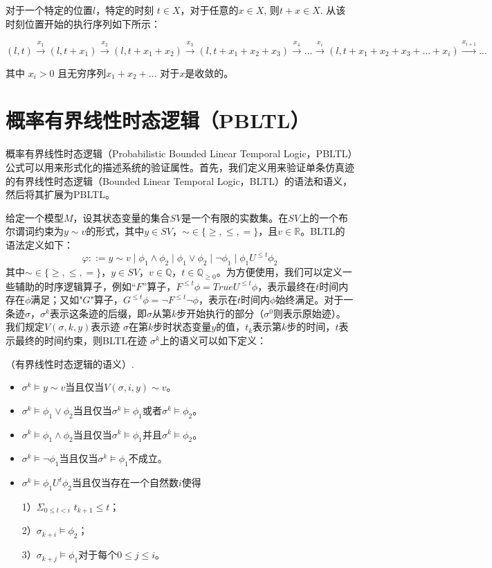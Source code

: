 对于一个特定的位置$l$，特定的时刻 $t \in X$，对于任意的$x \in X$, 则$t + x \in X$. 从该时刻位置开始的执行序列如下所示：

$(l,t) \xrightarrow{x_{1}} (l,t+x_{1}) \xrightarrow{x_{2}} (l,t+x_{1}+x_{2}) \xrightarrow{x_{3}} (l,t+x_{1}+x_{2}+x_{3}) \xrightarrow{x_{4}}...\xrightarrow{x_{i}}(l,t+x_{1}+x_{2}+x_{3}+...+x_{i}) \xrightarrow{x_{i+1}}...$

其中 $x_{i} > 0$ 且无穷序列$x_{1} + x_{2} + . . .$ 对于$x$是收敛的。 

\section{概率有界线性时态逻辑（PBLTL）}
概率有界线性时态逻辑（Probabilistic Bounded Linear Temporal Logic，PBLTL）公式可以用来形式化的描述系统的验证属性。首先，我们定义用来验证单条仿真迹的有界线性时态逻辑（Bounded Linear Temporal Logic，BLTL）的语法和语义，然后将其扩展为PBLTL。

给定一个模型$M$，设其状态变量的集合$SV$是一个有限的实数集。在$SV$上的一个布尔谓词约束为$y \sim v$的形式，其中$y\in SV$，$\sim \in \lbrace \geq,\leq,=\rbrace$，且$v\in \mathbb{R}$。BLTL的语法定义如下：
$$\varphi ::= y \sim v\mid\phi_{1}\wedge\phi_{2}\mid\phi_{1}\vee\phi_{2}\mid \neg \phi_{1}\mid\phi_{1}U^{\leq t}\phi_{2}
$$
其中$\sim \in \lbrace \geq,\leq,=\rbrace$，$y\in SV$，$v\in \mathbb{Q}$，$t\in \mathbb{Q}_{\geq 0}$。为方便使用，我们可以定义一些辅助的时序逻辑算子，例如“$F$”算子，$F^{\leq t}\phi = True U^{\leq t}\phi$，表示最终在$t$时间内存在$\phi$满足；又如"$G$"算子，$G^{\leq t}\phi = \neg F^{\leq t}\neg \phi$，表示在$t$时间内$\phi$始终满足。对于一条迹$\sigma$，$\sigma^k$表示这条迹的后缀，即$\sigma$从第$k$步开始执行的部分（$\sigma^0$则表示原始迹）。我们规定$V(\sigma,k,y)$表示迹 $\sigma$在第$k$步时状态变量$y$的值，$t_k$表示第$k$步的时间，$t$表示最终的时间约束，则BLTL在迹 $\sigma^k$上的语义可以如下定义：

\begin{define}\label{def:bltl_semantics}
（有界线性时态逻辑的语义）.	
\begin{itemize}
\item $\sigma^{k}\vDash y \sim v $当且仅当$V(\sigma,i,y)\sim v$。
\item $\sigma^{k}\vDash\phi_{1}\vee\phi_{2}$当且仅当$\sigma^{k}\vDash\phi_{1}$或者$\sigma^{k}\vDash\phi_{2}$。
\item $\sigma^{k}\vDash\phi_{1}\wedge\phi_{2}$当且仅当$\sigma^{k}\vDash\phi_{1}$并且$\sigma^{k}\vDash\phi_{2}$。
\item $\sigma^{k}\vDash\neg\phi_{1}$当且仅当$\sigma^{k}\vDash\phi_{1}$不成立。
\item $\sigma^{k}\vDash\phi_{1}U^{t}\phi_{2}$当且仅当存在一个自然数$i$使得

1）$ \Sigma_{0\leq l<i}$ $t_{k+1}\leq t$；

2）$ \sigma_{k+i}\models\phi_{2}$；

3）$\sigma_{k+j}\models\phi_{1}$对于每个$ 0\leq j \leq i$。
\end{itemize}
\end{define}

